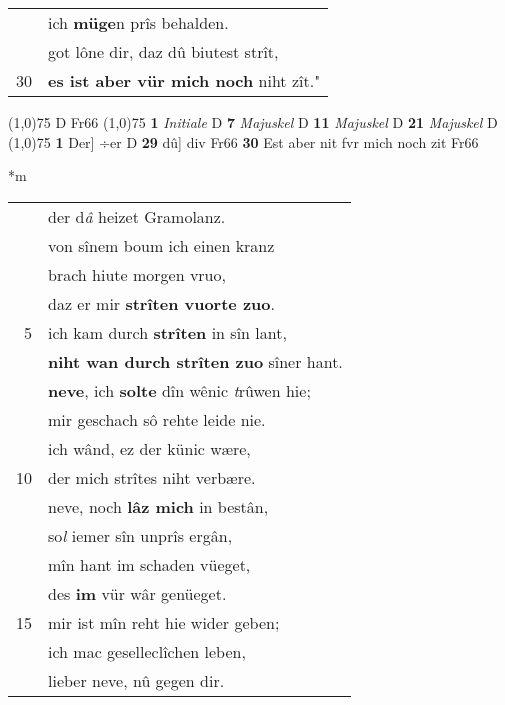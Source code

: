 \documentclass[8pt,a4paper,notitlepage]{article}
\begin{document}
\begin{table}[ht]
\begin{minipage}[t]{0.5\linewidth}
\begin{tabular}{rl}
 & ich \textbf{müge}n prîs behalden.\\ 
 & got lône dir, daz dû biutest strît,\\ 
30 & \textbf{es ist aber vür mich noch} niht zît."\\ 
\end{tabular}
\scriptsize
\line(1,0){75} \newline
D Fr66 \newline
\line(1,0){75} \newline
\textbf{1} \textit{Initiale} D  \textbf{7} \textit{Majuskel} D  \textbf{11} \textit{Majuskel} D  \textbf{21} \textit{Majuskel} D  \newline
\line(1,0){75} \newline
\textbf{1} Der] ÷er D \textbf{29} dû] div Fr66 \textbf{30} Est aber nit fvr mich noch zit Fr66 \newline
\end{minipage}
\hspace{0.5cm}
\begin{minipage}[t]{0.5\linewidth}
\small
\begin{center}*m
\end{center}
\begin{tabular}{rl}
 & der d\textit{â} heizet Gramolanz.\\ 
 & von sînem boum ich einen kranz\\ 
 & brach hiute morgen vruo,\\ 
 & daz er mir \textbf{strîten vuorte zuo}.\\ 
5 & ich kam durch \textbf{strîten} in sîn lant,\\ 
 & \textbf{niht wan durch strîten zuo} sîner hant.\\ 
 & \textbf{neve}, ich \textbf{solte} dîn wênic \textit{t}rûwen hie;\\ 
 & mir geschach sô rehte leide nie.\\ 
 & ich wând, ez der künic wære,\\ 
10 & der mich strîtes niht verbære.\\ 
 & neve, noch \textbf{lâz mich} in bestân,\\ 
 & so\textit{l} iemer sîn unprîs ergân,\\ 
 & mîn hant im schaden vüeget,\\ 
 & des \textbf{im} vür wâr genüeget.\\ 
15 & mir ist mîn reht hie wider geben;\\ 
 & ich mac geselleclîchen leben,\\ 
 & lieber neve, nû gegen dir.\\ 

\end{tabular}
\end{minipage}
\end{table}
\end{document}
